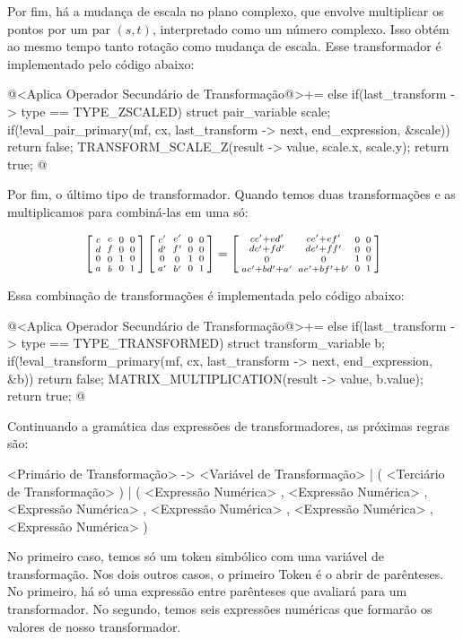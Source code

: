 Por fim, há a mudança de escala no plano complexo, que envolve
multiplicar os pontos por um par $(s, t)$, interpretado como um número
complexo. Isso obtém ao mesmo tempo tanto rotação como mudança de
escala. Esse transformador é implementado pelo código abaixo:

\iniciocodigo
@<Aplica Operador Secundário de Transformação@>+=
else if(last_transform -> type == TYPE_ZSCALED){
  struct pair_variable scale;
  if(!eval_pair_primary(mf, cx, last_transform -> next, end_expression,
                        &scale))
    return false;
  TRANSFORM_SCALE_Z(result -> value, scale.x, scale.y);
  return true;
}
@
\fimcodigo

Por fim, o último tipo de transformador. Quando temos duas
transformações e as multiplicamos para combiná-las em uma só:

$$\left[{{c \atop d}\atop
      {0\atop a}}{{e \atop f}\atop {0 \atop
      b}}{{0\atop 0}\atop{1 \atop 0}}{{0 \atop 0}\atop{0\atop
      1}}\right]
\left[{{c' \atop d'}\atop
      {0\atop a'}}{{e' \atop f'}\atop {0 \atop
      b'}}{{0\atop 0}\atop{1 \atop 0}}{{0 \atop 0}\atop{0\atop
      1}}\right]
=
\left[{{cc'+ed' \atop dc'+fd'} \atop  {0\atop ac'+bd'+a'}}
      {{ce'+ef' \atop de'+ff'}\atop   {0 \atop ae'+bf'+b'}}
      {{0\atop 0}\atop{1 \atop 0}}
      {{0 \atop 0}\atop{0\atop 1}}\right]
$$

Essa combinação de transformações é implementada pelo código abaixo:

\iniciocodigo
@<Aplica Operador Secundário de Transformação@>+=
else if(last_transform -> type == TYPE_TRANSFORMED){
  struct transform_variable b;
  if(!eval_transform_primary(mf, cx, last_transform -> next, end_expression,
                            &b))
    return false;
  MATRIX_MULTIPLICATION(result -> value, b.value);
  return true;
}
@
\fimcodigo


Continuando a gramática das expressões de transformadores, as próximas
regras são:

\alinhaverbatim
<Primário de Transformação> -> <Variável de Transformação> |
                               ( <Terciário de Transformação> ) |
                               ( <Expressão Numérica> , <Expressão Numérica> ,
                                 <Expressão Numérica> , <Expressão Numérica> ,
                                 <Expressão Numérica> , <Expressão Numérica> )
\alinhanormal

No primeiro caso, temos só um token simbólico com uma variável de
transformação. Nos dois outros casos, o primeiro Token é o abrir de
parênteses. No primeiro, há só uma expressão entre parênteses que
avaliará para um transformador. No segundo, temos seis expressões
numéricas que formarão os valores de nosso transformador.

